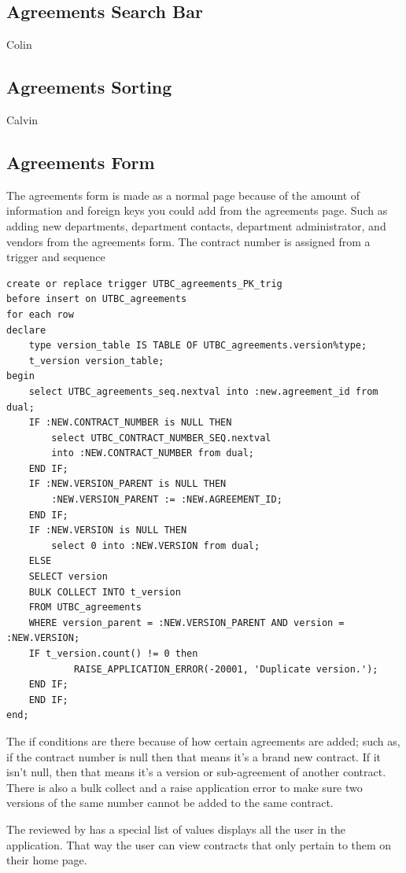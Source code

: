 \documentclass{report}
\begin{document}
\subsection{Agreements Search Bar}
Colin 

\subsection{Agreements Sorting}
Calvin

\subsection{Agreements Form}
The agreements form is made as a normal page because of the amount of information and foreign keys you could add from the agreements page. Such as adding new departments, department contacts, department administrator, and vendors from the agreements form. The contract number is assigned from a trigger and sequence

\begin{lstlisting}[caption=Agreement table PK trigger]
create or replace trigger UTBC_agreements_PK_trig 
before insert on UTBC_agreements
for each row 
declare
	type version_table IS TABLE OF UTBC_agreements.version%type;
	t_version version_table;
begin 
	select UTBC_agreements_seq.nextval into :new.agreement_id from dual;
	IF :NEW.CONTRACT_NUMBER is NULL THEN
		select UTBC_CONTRACT_NUMBER_SEQ.nextval 
		into :NEW.CONTRACT_NUMBER from dual;
	END IF;
	IF :NEW.VERSION_PARENT is NULL THEN
		:NEW.VERSION_PARENT := :NEW.AGREEMENT_ID;
	END IF;
	IF :NEW.VERSION is NULL THEN
		select 0 into :NEW.VERSION from dual;
	ELSE 
  	SELECT version
  	BULK COLLECT INTO t_version 
  	FROM UTBC_agreements 
  	WHERE version_parent = :NEW.VERSION_PARENT AND version = :NEW.VERSION;
  	IF t_version.count() != 0 then
    		RAISE_APPLICATION_ERROR(-20001, 'Duplicate version.');
  	END IF;
	END IF;
end; 
\end{lstlisting}

The if conditions are there because of how certain agreements are added; such as, if the contract number is null then that means it's a brand new contract. If it isn't null, then that means it's a version or sub-agreement of another contract. There is also a bulk collect and a raise application error to make sure two versions of the same number cannot be added to the same contract.

The reviewed by has a special list of values displays all the user in the application. That way the user can view contracts that only pertain to them on their home page.
\end{document}

